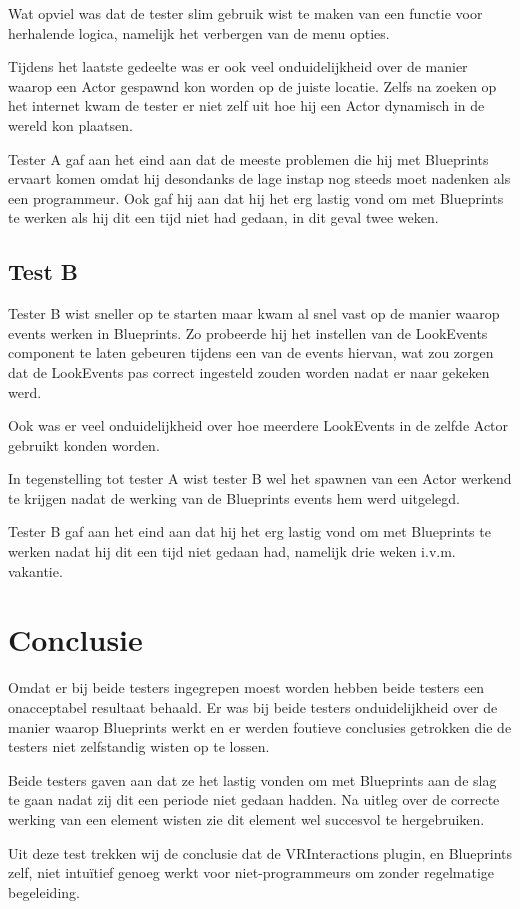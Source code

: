Wat opviel was dat de tester slim gebruik wist te maken van een functie voor herhalende logica, namelijk het verbergen van de menu opties. 

Tijdens het laatste gedeelte was er ook veel onduidelijkheid over de manier waarop een Actor gespawnd kon worden op de juiste locatie. Zelfs na zoeken op het internet kwam de tester er niet zelf uit hoe hij een Actor dynamisch in de wereld kon plaatsen.

Tester A gaf aan het eind aan dat de meeste problemen die hij met Blueprints ervaart komen omdat hij desondanks de lage instap nog steeds moet nadenken als een programmeur. Ook gaf hij aan dat hij het erg lastig vond om met Blueprints te werken als hij dit een tijd niet had gedaan, in dit geval twee weken.

\subsection*{Test B}
Tester B wist sneller op te starten maar kwam al snel vast op de manier waarop events werken in Blueprints. Zo probeerde hij het instellen van de LookEvents component te laten gebeuren tijdens een van de events hiervan, wat zou zorgen dat de LookEvents pas correct ingesteld zouden worden nadat er naar gekeken werd.

Ook was er veel onduidelijkheid over hoe meerdere LookEvents in de zelfde Actor gebruikt konden worden. 

In tegenstelling tot tester A wist tester B wel het spawnen van een Actor werkend te krijgen nadat de werking van de Blueprints events hem werd uitgelegd.

Tester B gaf aan het eind aan dat hij het erg lastig vond om met Blueprints te werken nadat hij dit een tijd niet gedaan had, namelijk drie weken i.v.m. vakantie.

\section{Conclusie}
Omdat er bij beide testers ingegrepen moest worden hebben beide testers een onacceptabel resultaat behaald. Er was bij beide testers onduidelijkheid over de manier waarop Blueprints werkt en er werden foutieve conclusies getrokken die de testers niet zelfstandig wisten op te lossen.

Beide testers gaven aan dat ze het lastig vonden om met Blueprints aan de slag te gaan nadat zij dit een periode niet gedaan hadden. Na uitleg over de correcte werking van een element wisten zie dit element wel succesvol te hergebruiken.

Uit deze test trekken wij de conclusie dat de VRInteractions plugin, en Blueprints zelf, niet intuïtief genoeg werkt voor niet-programmeurs om zonder regelmatige begeleiding.
